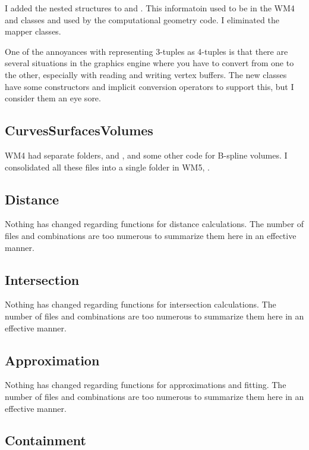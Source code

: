 \documentclass{article}
\begin{document}
I added the  nested structures to 
and .  This informatoin used to be in the WM4 
and  classes and used by the computational geometry code.
I eliminated the mapper classes.

One of the annoyances with representing 3-tuples as 4-tuples is that there
are several situations in the graphics engine where you have to convert
from one to the other, especially with reading and writing vertex buffers.
The new classes have some constructors and implicit conversion operators to
support this, but I consider them an eye sore.

\subsection{CurvesSurfacesVolumes}

WM4 had separate folders,  and , and some other
code for B-spline volumes.  I consolidated all these files into a single
folder in WM5, .

\subsection{Distance}

Nothing has changed regarding functions for distance calculations.  The
number of files and combinations are too numerous to summarize them here
in an effective manner.

\subsection{Intersection}

Nothing has changed regarding functions for intersection calculations.  The
number of files and combinations are too numerous to summarize them here
in an effective manner.

\subsection{Approximation}

Nothing has changed regarding functions for approximations and fitting.  The
number of files and combinations are too numerous to summarize them here
in an effective manner.

\subsection{Containment}
\end{document}
